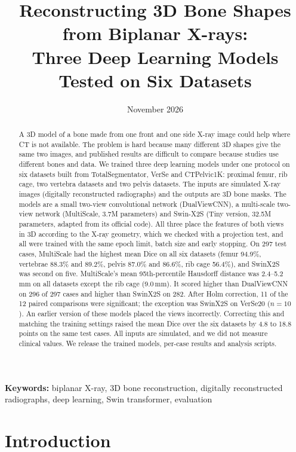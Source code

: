 \documentclass[11pt]{article}
\title{Reconstructing 3D Bone Shapes from Biplanar X-rays:\\Three Deep Learning Models Tested on Six Datasets}
\author{}
\date{November 2026}
\begin{document}
\maketitle

\begin{abstract}
\noindent
A 3D model of a bone made from one front and one side X-ray image could help where CT is not available. The problem is hard because many different 3D shapes give the same two images, and published results are difficult to compare because studies use different bones and data. We trained three deep learning models under one protocol on six datasets built from TotalSegmentator, VerSe and CTPelvic1K: proximal femur, rib cage, two vertebra datasets and two pelvis datasets. The inputs are simulated X-ray images (digitally reconstructed radiographs) and the outputs are 3D bone masks. The models are a small two-view convolutional network (DualViewCNN), a multi-scale two-view network (MultiScale, 3.7M parameters) and Swin-X2S (Tiny version, 32.5M parameters, adapted from its official code). All three place the features of both views in 3D according to the X-ray geometry, which we checked with a projection test, and all were trained with the same epoch limit, batch size and early stopping. On 297 test cases, MultiScale had the highest mean Dice on all six datasets (femur 94.9\%, vertebrae 88.3\% and 89.2\%, pelvis 87.0\% and 86.6\%, rib cage 56.4\%), and SwinX2S was second on five. MultiScale's mean 95th-percentile Hausdorff distance was 2.4--5.2\,mm on all datasets except the rib cage (9.0\,mm). It scored higher than DualViewCNN on 296 of 297 cases and higher than SwinX2S on 282. After Holm correction, 11 of the 12 paired comparisons were significant; the exception was SwinX2S on VerSe20 ($n=10$). An earlier version of these models placed the views incorrectly. Correcting this and matching the training settings raised the mean Dice over the six datasets by 4.8 to 18.8 points on the same test cases. All inputs are simulated, and we did not measure clinical values. We release the trained models, per-case results and analysis scripts.
\end{abstract}

\noindent\textbf{Keywords:} biplanar X-ray, 3D bone reconstruction, digitally reconstructed radiographs, deep learning, Swin transformer, evaluation

\section{Introduction}
\end{document}
